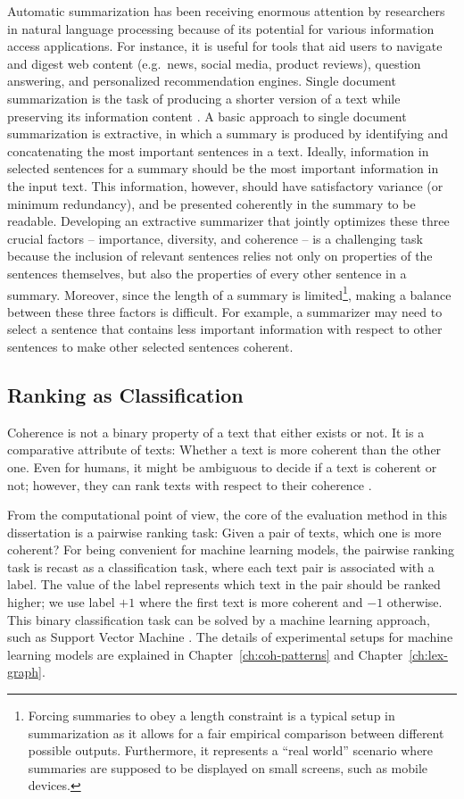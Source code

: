 Automatic summarization has been receiving enormous attention by researchers in natural language processing because of its potential for various information access applications. 
For instance, it is useful for tools that aid users to navigate and digest web content (e.g.\ news, social media, product reviews), question answering, and personalized recommendation engines. 
Single document summarization is the task of producing a shorter version of a text while preserving its information content \cite{nenkova11}. 
A basic approach to single document summarization is extractive, in which a summary is produced by identifying and concatenating the most important sentences in a text. 
Ideally, information in selected sentences for a summary should be the most important information in the input text. 
This information, however, should have satisfactory variance (or minimum redundancy), and be presented coherently in the summary to be readable. 
Developing an extractive summarizer that jointly optimizes these three crucial factors -- importance, diversity, and coherence -- is a challenging task because the inclusion of relevant sentences relies not only on properties of the sentences themselves, but also the properties of every other sentence in a summary. 
Moreover, since the length of a summary is limited\footnote{Forcing summaries to obey a length constraint is a typical setup in summarization as it allows for a fair empirical comparison between different possible outputs. 
 Furthermore, it represents a ``real world'' scenario where summaries are supposed to be displayed on small screens, such as mobile devices.
}, making a balance between these three factors is difficult. 
For example, a summarizer may need to select a sentence that contains less important information with respect to other sentences to make other selected sentences coherent. 

\subsection{Ranking as Classification} 

Coherence is not a binary property of a text that either exists or not. 
It is a comparative attribute of texts: Whether a text is more coherent than the other one. 
Even for humans, it might be ambiguous to decide if a text is coherent or not; however, they can rank texts with respect to their coherence \cite{halliday76}.   

From the computational point of view, the core of the evaluation method in this dissertation is a pairwise ranking task: Given a pair of texts, which one is more coherent? 
For being convenient for machine learning models, the pairwise ranking task is recast as a classification task, where each text pair is associated with a label. 
The value of the label represents which text in the pair should be ranked higher; we use label $+1$ where the first text is more coherent and $-1$ otherwise. 
This binary classification task can be solved by a machine learning approach, such as Support Vector Machine \cite{bishop06}.  
The details of experimental setups for machine learning models are explained in Chapter~\ref{ch:coh-patterns} and Chapter~\ref{ch:lex-graph}.  

